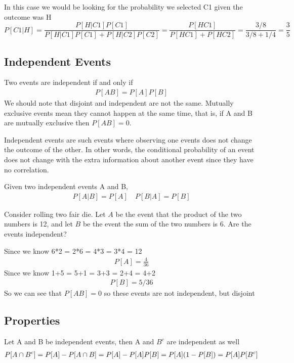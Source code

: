 \documentclass[12pt, titlepage, oneside]{article}
\begin{document}
In this case we would be looking for the probability we selected C1 given the outcome was H 
\begin{equation}
P[C1|H] = \frac{ P[H|C1]P[C1] }{P[H|C1]P[C1] + P[H|C2]P[C2]} = \frac{P[HC1]}{P[HC1] + P[HC2]} = \frac{3/8}{3/8+1/4} = \frac{3}{5}
\end{equation}


\subsection{Independent Events}

Two events are independent if and only if 
\begin{align}
P[AB] = P[A]P[B]
\end{align}
We should note that disjoint and independent are not the same. Mutually exclusive events mean they cannot happen at the same time, that is, if A and B are mutually exclusive then $P[AB] = 0$. 

Independent events are such events where observing one events does not change the outcome of the other. In other words, the conditional probability of an event does not change with the extra information about another event since they have no correlation.

Given two independent events A and B, 
\begin{align} 
P[A|B] = P[A] \enspace \enspace P[B|A] = P[B]
\end{align}

\ex Consider rolling two fair die. Let $A$ be the event that the product of the two numbers is 12, and let $B$ be the event the sum of the two numbers is 6. Are the events independent?

Since we know 6*2 = 2*6 = 4*3 = 3*4 = 12
\begin{align}
P[A] = \frac{4}{36}
\end{align}
Since we know 1+5 = 5+1 = 3+3 = 2+4 = 4+2 
\begin{align}
P[B] = 5/36
\end{align}
So we can see that $P[AB] = 0$ so these events are not independent, but disjoint

\subsection{Properties}
Let A and B be independent events, then A and $B^c$ are independent as well
\begin{align}
P[A\cap B^c] = P[A] - P[A \cap B] = P[A] - P[A]P[B]  = P[A](1-P[B]) = P[A]P[B^c]
\end{align}
\end{document}
